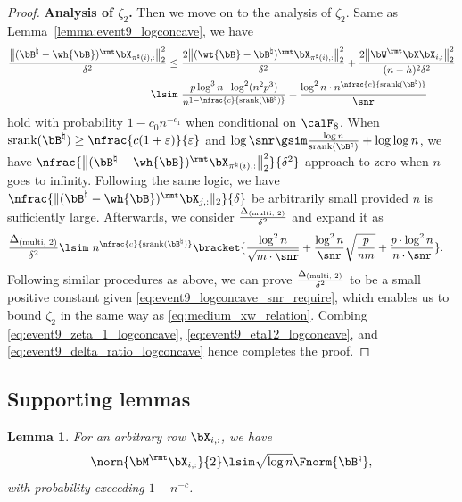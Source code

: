 \documentclass[11pt]{article}
\newtheorem{lemma}{Lemma}
\def \bBtrue {\bB^{\natural}}
\def\srank#1{\textup{srank}(#1)}
\begin{document}
\begin{proof}
\vspace{0.1in}\noindent
\textbf{Analysis of $\zeta_2$.}
Then we move on to the analysis of $\zeta_2$. Same as Lemma~\ref{lemma:event9_logconcave}, we
have
\begin{align}
\frac{\big\|(\bBtrue - \wh{\bB}  )^{\rmt} \bX_{\pi^{\natural}(i), :} \big\|^2_{2}}{\delta^2}
\leq~& \frac{2\big\|(\wt{\bB} - \bBtrue )^{\rmt} \bX_{\pi^{\natural}(i), :} \big\|^2_{2}}{\delta^2}
+ \frac{2\big\|\bW^{\rmt}\bX \bX_{i, :}\big\|^2_2}{(n-h)^2 \delta^2} \notag \\
\lsim~&
\frac{p \log^3 n\cdot \log^2(n^2 p^3)}{n^{1- \nfrac{c}{\srank{\bBtrue}}}}
+ \frac{\log^2 n \cdot n^{\nfrac{c}{\srank{\bBtrue}}}}{\snr}
\label{eq:event9_eta12_logconcave}
\end{align}
hold with probability $1-c_0 n^{-c_1}$ when conditional on
$\calF_8$. When $\srank{\bBtrue} \geq \nfrac{c(1+\varepsilon)}{\varepsilon}$ and
$\log\snr \gsim \frac{\log n}{\srank{\bBtrue}} + \log \log n$,
we have $\nfrac{\big\|(\bBtrue - \wh{\bB}  )^{\rmt} \bX_{\pi^{\natural}(i), :} \big\|^2_{2}}{\delta^2}$
approach to zero when $n$ goes to infinity.
Following the same logic, we have
$\nfrac{\|(\bBtrue - \wh{\bB})^{\rmt} \bX_{j, :} \|_{2}}{\delta}$
be arbitrarily small provided $n$ is sufficiently large.
Afterwards, we consider $\frac{\Delta_{(\textup{multi, 2})}}{\delta^2}$ and expand it as
\begin{align}
& \frac{\Delta_{(\textup{multi, 2})}}{\delta^2} \lsim \
n^{\nfrac{c}{\srank{\bBtrue}}}\bracket{\frac{\log^2 n}{\sqrt{m \cdot \snr}}
+ \frac{ \log^2 n}{\snr}
\sqrt{\frac{p}{nm}} +
\frac{p\cdot \log^2 n }{n\cdot \snr}}.
\label{eq:event9_delta_ratio_logconcave}
\end{align}
Following similar procedures as above, we can prove
$\frac{\Delta_{(\textup{multi, 2})}}{\delta^2}$ to be a small positive constant
given \eqref{eq:event9_logconcave_snr_require}, which
enables us to bound $\zeta_2$ in the same way as \eqref{eq:medium_xw_relation}.
Combing \eqref{eq:event9_zeta_1_logconcave}, \eqref{eq:event9_eta12_logconcave}, and \eqref{eq:event9_delta_ratio_logconcave} hence completes the proof.
\end{proof}


\subsection{Supporting lemmas}
\label{subsec:appendix_proof_multi_observe_support_lemma}

\begin{lemma}
\label{lemma:x_row_norm_ub}
For an arbitrary row $\bX_{i, :}$, we have
\[
\norm{\bM^{\rmt}\bX_{i, :}}{2} \lsim \sqrt{\log n} \Fnorm{\bBtrue},
\]
with probability exceeding $1 - n^{-c}$.
\end{lemma}
\end{document}
